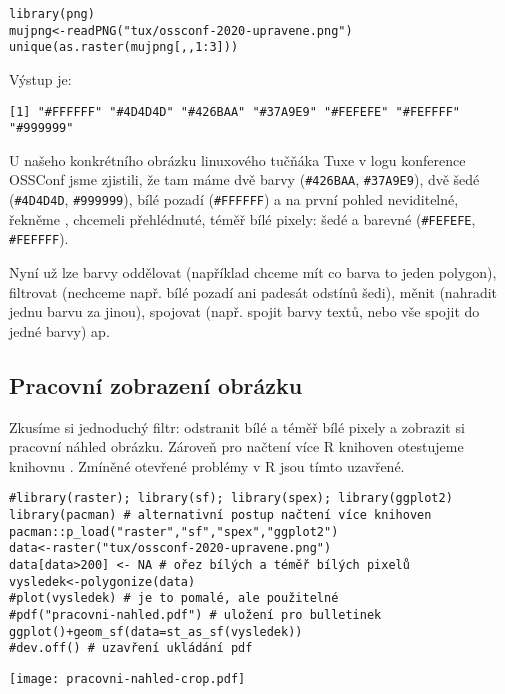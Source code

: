 \newpage
\begin{lstlisting}
library(png)
mujpng<-readPNG("tux/ossconf-2020-upravene.png")
unique(as.raster(mujpng[,,1:3]))
\end{lstlisting}

Výstup je:
\begin{lstlisting}
[1] "#FFFFFF" "#4D4D4D" "#426BAA" "#37A9E9" "#FEFEFE" "#FEFFFF" "#999999"
\end{lstlisting}

U našeho konkrétního obrázku linuxového tučňáka Tuxe v logu konference OSSConf jsme zjistili, že tam máme dvě barvy (\texttt{\#426BAA}, \texttt{\#37A9E9}), dvě šedé (\texttt{\#4D4D4D}, \texttt{\#999999}), bílé pozadí (\texttt{\#FFFFFF}) a na první pohled neviditelné, řekněme , chceme\z li přehlédnuté, téměř bílé pixely: šedé a barevné (\texttt{\#FEFEFE}, \texttt{\#FEFFFF}). 

Nyní už lze barvy oddělovat (například chceme mít co barva to jeden polygon), filtrovat (nechceme např. bílé pozadí ani padesát odstínů šedi), měnit (nahradit jednu barvu za jinou), spojovat (např. spojit barvy textů, nebo vše spojit do jedné barvy) ap.

\subsection{Pracovní zobrazení obrázku}
Zkusíme si jednoduchý filtr: odstranit bílé a téměř bílé pixely a zobrazit si pracovní náhled obrázku. Zároveň pro načtení více R knihoven otestujeme knihovnu . Zmíněné otevřené problémy v R jsou tímto uzavřené.
\begin{lstlisting}
#library(raster); library(sf); library(spex); library(ggplot2)
library(pacman) # alternativní postup načtení více knihoven
pacman::p_load("raster","sf","spex","ggplot2")
data<-raster("tux/ossconf-2020-upravene.png")
data[data>200] <- NA # ořez bílých a téměř bílých pixelů
vysledek<-polygonize(data)
#plot(vysledek) # je to pomalé, ale použitelné
#pdf("pracovni-nahled.pdf") # uložení pro bulletinek
ggplot()+geom_sf(data=st_as_sf(vysledek))
#dev.off() # uzavření ukládání pdf
\end{lstlisting}

\enlargethispage{\baselineskip}
\noindent
\hfil
\texttt{[image: pracovni-nahled-crop.pdf]}

